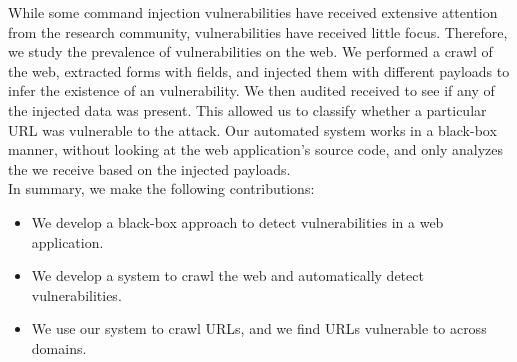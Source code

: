 
While some command injection vulnerabilities have received extensive attention from the research community, \ehi vulnerabilities have received little focus. Therefore, we study the prevalence of \ehi vulnerabilities on the web. We performed a crawl of the web, extracted forms with \email fields, and injected them with different payloads to infer the existence of an \ehi vulnerability. We then audited received \emails to see if any of the injected data was present. This allowed us to classify whether a particular URL was vulnerable to the attack. Our automated system works in a black-box manner, without looking at the web application's source code, and only analyzes the \emails we receive based on the injected payloads.
\\

\noindent{}In summary, we make the following contributions:

\begin{itemize}

\item We develop a black-box approach to detect \ehi vulnerabilities in a web application.

\item We develop a system to crawl the web and automatically detect \ehi vulnerabilities.

\item We use our system to crawl \urls URLs, and we find \success URLs vulnerable to \ehi across \domains domains. 

\end{itemize}
